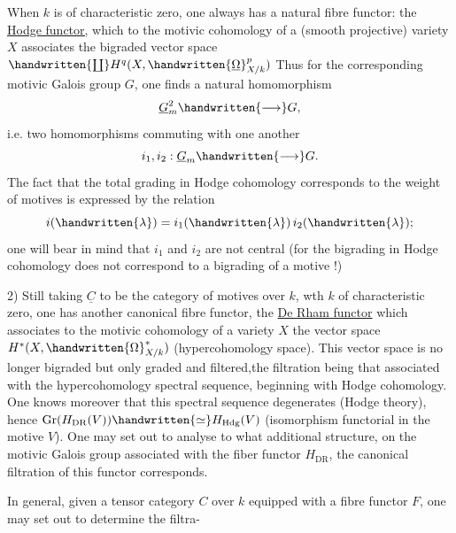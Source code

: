 
When $k$ is of characteristic zero, one always has a natural fibre functor: the \uline{Hodge functor,} which to the motivic cohomology of a (smooth projective) variety $X$ associates the bigraded vector space $\handwritten{\coprod}H^q(X,\handwritten{\underline{\Omega}}^p_{X/k})$ Thus for the corresponding motivic Galois group $G$, one finds a natural homomorphism\quad{}
\[
\underline{G}_m^2\handwritten{\longrightarrow}G,
\]
i.e. two homomorphisms commuting with one another\hspace{1em}
\[
i_1,i_2:\underline{G}_m\handwritten{\longrightarrow}G.
\]
The fact that the total grading in Hodge cohomology corresponds to the weight of motives is expressed by the relation
\[
i(\handwritten{\lambda})=i_1(\handwritten{\lambda})\,i_2(\handwritten{\lambda});
\]
one will bear in mind that $i_1$ and $i_2$ are not central (for the bigrading in Hodge cohomology does not correspond to a bigrading of a motive !)

2) Still taking $\underline{C}$ to be the category of motives over $k$, wth $k$ of characteristic zero, one has another canonical fibre functor, the \uline{De Rham functor} which associates to the motivic cohomology of a variety $X$ the vector space $H^*(X,\handwritten{\Omega}^*_{X/k})$ (hypercohomology space). This vector space is no longer bigraded but only graded and filtered,\handwritten{(}the filtration being that associated with the hypercohomology spectral sequence, beginning with Hodge cohomology\handwritten{)}. One knows moreover that this spectral sequence degenerates (Hodge theory), hence $\operatorname{Gr}(H_{\mathrm{DR}}(V))\handwritten{\simeq}H_{\mathrm{Hdg}}(V)$ (isomorphism functorial in the motive $V$). One may set out to analyse to what additional structure, on the motivic Galois group associated with the fiber functor $H_{\mathrm{DR}}$, the canonical filtration of this functor corresponds.


In general, given a tensor category $C$ over $k$ equipped with a fibre functor $F$, one may set out to determine the filtra-
